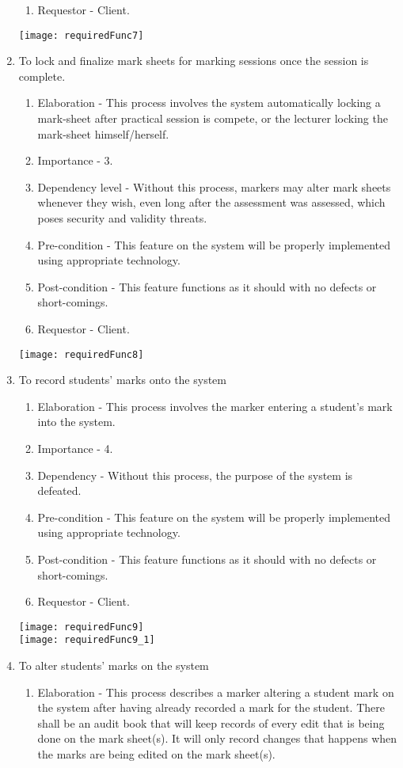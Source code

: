 \documentclass[12pt, a4paper]{scrartcl}
\begin{document}
\begin{enumerate}
\begin{enumerate}
						\item Requestor - Client.
					\end{enumerate}
					\texttt{[image: requiredFunc7]}
					\item To lock and finalize mark sheets for marking sessions once the session is complete.
					\begin{enumerate}
						\item Elaboration - This process involves the system automatically locking a mark-sheet after practical session is compete, or the lecturer locking the mark-sheet himself/herself.
						\item Importance - 3.
						\item Dependency level - Without this process, markers may alter mark sheets whenever they wish, even long after the assessment was assessed, which poses security and validity threats.
						\item Pre-condition - This feature on the system will be properly implemented using appropriate technology.
						\item Post-condition - This feature functions as it should with no defects or short-comings.
						\item Requestor - Client.
					\end{enumerate}
					\texttt{[image: requiredFunc8]}
					\item To record students’ marks onto the system
					\begin{enumerate}
						\item Elaboration - This process involves the marker entering a student’s mark into the system.
						\item Importance - 4.
						\item Dependency - Without this process, the purpose of the system is defeated.
						\item Pre-condition - This feature on the system will be properly implemented using appropriate technology.
						\item Post-condition - This feature functions as it should with no defects or short-comings.
						\item Requestor - Client.
					\end{enumerate}
					\texttt{[image: requiredFunc9]}\\
					\texttt{[image: requiredFunc9\_1]}
					\item To alter students’ marks on the system
					\begin{enumerate}
						\item Elaboration - This process describes a marker altering a student mark on the system after having already recorded a mark for the student. There shall be an audit book that will keep records of every edit that is being done on the mark sheet(s). It will only record changes that happens when the marks are being edited on the mark sheet(s).

\end{enumerate}
\end{enumerate}
\end{document}
